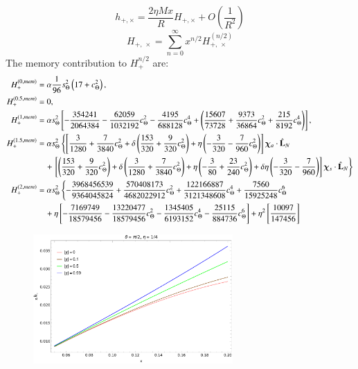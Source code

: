 \documentclass[prd,preprintnumbers,twocolumn,eqsecnum,floatfix,letter]{revtex4}
\begin{document}
\begin{widetext}
\begin{equation}
	h_{+,\times} = \frac{2\eta Mx}{R}H_{+,\times} + O\left(\frac{1}{R^2}\right)
\end{equation}
\begin{equation}
	H_{+,\,\times}= \sum_{n=0}^{\infty}x^{n/2}H_{+,\,\times}^{(n/2)}
\end{equation}
The memory contribution to $H_{+}^{n/2} $ are:
\begin{subequations}
\begin{align}
	H_{+}^{(0,mem)}&=\alpha\frac{1}{96}s_{\Theta}^2\left(17 + c_{\Theta}^2\right),\\
	H_{+}^{(0.5,mem)}&=0,\\
	H_{+}^{(1,mem)}&=\alpha s_{\Theta}^2\left[-\frac{354241}{2064384} - \frac{62059}{1032192}c_{\Theta}^2 - \frac{4195}{688128}c_{\Theta}^4 + \left(\frac{15607}{73728} + \frac{9373}{36864}c_{\Theta}^2 +\frac{215}{8192}c_{\Theta}^4\right)\right],\\
	H_{+}^{(1.5,mem)}&=\alpha s_{\Theta}^2\left\{\left[\frac{3}{1280}  + \frac{7}{3840}c_{\Theta}^2 +  \delta\left(\frac{153}{320} + \frac{9}{320}c_{\Theta}^2\right) +\eta \left(-\frac{3}{320}-\frac{7}{960}c_{\Theta}^2\right)\right]\bm{\chi}_a \cdot \hat{\mathbf{L}}_N\right.\nonumber\\
	& \quad+\left.\left[\left(\frac{153}{320} + \frac{9}{320}c_{\Theta}^2\right) + \delta\left(\frac{3}{1280} + \frac{7}{3840}c_{\Theta}^2\right) + \eta\left(-\frac{3}{80} +\frac{23}{240}c_{\Theta}^2\right) + \delta\eta\left(-\frac{3}{320}-\frac{7}{960}\right)\right]\bm{\chi}_s \cdot \hat{\mathbf{L}}_N\right\}\\
	H_{+}^{(2,mem)} &=\alpha s_{\Theta}^2\left\{-\frac{3968456539}{9364045824} + \frac{570408173}{4682022912}c_{\Theta}^2 + \frac{122166887}{3121348608}c_{\Theta}^4 + \frac{7560}{15925248}c_{\Theta}^6 \right.\nonumber\\
	& \quad + \eta\left[-\frac{7169749}{18579456} - \frac{13220477}{18579456}c_{\Theta}^2 -\frac{1345405}{6193152}c_{\Theta}^4 - \frac{25115}{884736}c_{\Theta}^6\right] + \eta^2\left[\frac{10097}{147456}\right]
\end{align}
\end{subequations}
\begin{figure}
	\includegraphics[width=3.0in]{../plots/PNmemoryContributiontoHplus.pdf}

\end{figure}
\end{widetext}
\end{document}
